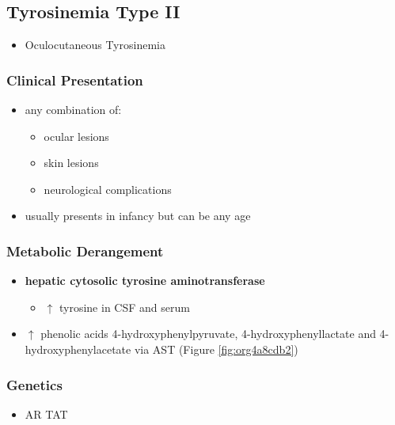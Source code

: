 \documentclass[12pt]{scrartcl}
\begin{document}
\subsection{Tyrosinemia Type II}
\label{sec:orgbfa7df4}
\begin{itemize}
\item Oculocutaneous Tyrosinemia
\end{itemize}
\subsubsection{Clinical Presentation}
\label{sec:org7efaf8f}
\begin{itemize}
\item any combination of: 
\begin{itemize}
\item ocular lesions
\item skin lesions
\item neurological complications
\end{itemize}
\item usually presents in infancy but can be any age
\end{itemize}

\subsubsection{Metabolic Derangement}
\label{sec:org768b709}
\begin{itemize}
\item \textbf{hepatic cytosolic tyrosine aminotransferase}


\begin{itemize}
\item \(\uparrow\) tyrosine in CSF and serum
\end{itemize}
\item \(\uparrow\) phenolic acids 4-hydroxyphenylpyruvate,
4-hydroxyphenyllactate and 4-hydroxyphenylacetate via AST (Figure \ref{fig:org4a8cdb2})
\end{itemize}

\subsubsection{Genetics}
\label{sec:org0acd305}
\begin{itemize}
\item AR TAT
\end{itemize}
\end{document}
